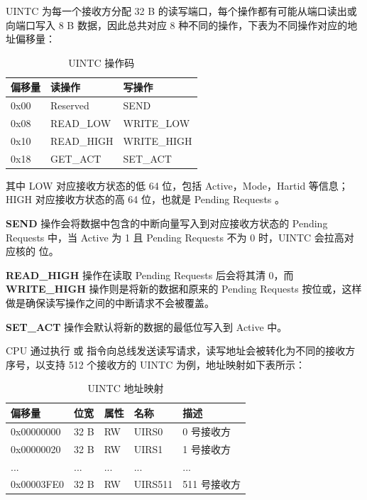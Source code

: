 UINTC 为每一个接收方分配 32 B 的读写端口，每个操作都有可能从端口读出或向端口写入 8 B 数据，因此总共对应 8 种不同的操作，下表为不同操作对应的地址偏移量：

\begin{table}
    \label{tab:uintc}
    \centering
    \begin{threeparttable}[c]
        \begin{tabular}{|l|l|l|}
            \hline
            偏移量 & 读操作 & 写操作 \\
            \hline
            0x00 & Reserved & SEND \\
            \hline
            0x08 & READ\_LOW & WRITE\_LOW \\
            \hline
            0x10 & READ\_HIGH & WRITE\_HIGH \\
            \hline
            0x18 & GET\_ACT & SET\_ACT \\
            \hline
        \end{tabular}
        \caption{UINTC 操作码}
    \end{threeparttable}
\end{table}

其中 LOW 对应接收方状态的低 64 位，包括 Active，Mode，Hartid 等信息；HIGH 对应接收方状态的高 64 位，也就是 Pending Requests 。

\textbf{SEND} 操作会将数据中包含的中断向量写入到对应接收方状态的 Pending Requests 中，当 Active 为 1 且 Pending Requests 不为 0 时，UINTC 会拉高对应核的 \FcsrUipUsip 位。

\textbf{READ\_HIGH} 操作在读取 Pending Requests 后会将其清 0，而 \textbf{WRITE\_HIGH} 操作则是将新的数据和原来的 Pending Requests 按位或，这样做是确保读写操作之间的中断请求不会被覆盖。

\textbf{SET\_ACT} 操作会默认将新的数据的最低位写入到 Active 中。

CPU 通过执行 \Isd 或 \Ild 指令向总线发送读写请求，读写地址会被转化为不同的接收方序号，以支持 512 个接收方的 UINTC 为例，地址映射如下表所示：

\begin{table}
    \centering
    \begin{threeparttable}[c]
        \begin{tabular}{|l|l|l|l|l|}
            \hline
            偏移量 & 位宽 & 属性 & 名称 & 描述 \\
            \hline
            0x00000000 & 32 B & RW & UIRS0 & 0 号接收方 \\
            \hline
            0x00000020 & 32 B & RW & UIRS1 & 1 号接收方 \\
            \hline
            ... & ... & ... & ... & ... \\
            \hline
            0x00003FE0 & 32 B & RW & UIRS511 & 511 号接收方 \\
            \hline
        \end{tabular}
        \caption{UINTC 地址映射}
        \label{tab:uintc2}
    \end{threeparttable}
\end{table}

